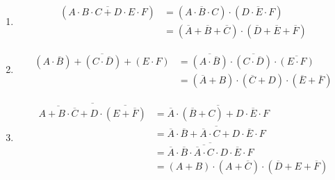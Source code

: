 \documentclass[a4paper]{article}
\begin{document}
{\begin{enumerate}[label=(\alph*)]
        \item
        \begin{align*}
            (\overline{A\cdot B\cdot C+D\cdot E\cdot F})&=(\overline{A\cdot B\cdot C})\cdot (\overline{D\cdot E\cdot F})\\
            &=(\overline{A}+\overline{B}+\overline{C})\cdot (\overline{D}+\overline{E}+\overline{F})
        \end{align*}
        \item
        \begin{align*}
            \overline{(A\cdot\overline{B})+(C\cdot\overline{D})+(E\cdot F)}&=\overline{(A\cdot\overline{B})}\cdot \overline{(C\cdot\overline{D})}\cdot \overline{(E\cdot F)}\\
            &=(\overline{A}+ B)\cdot (\overline{C}+ D)\cdot (\overline{E}+ \overline{F})
        \end{align*}
        \item
        \begin{align*}
             \overline{ \overline{ A + B \cdot \overline{ C}} + D \cdot \overline{ (E + \overline{ F})}} &=
 \overline{ \overline{ A} \cdot (\overline{ B} + C) + D \cdot \overline{ E} \cdot F} \\&=
     \overline{ \overline{ A} \cdot \overline{ B} + \overline{ A} \cdot C + D \cdot \overline{ E} \cdot F} \\&=
     \overline{ \overline{ A} \cdot \overline{ B} \cdot \overline{ \overline{ A} \cdot C} \cdot D \cdot \overline{ E} \cdot F} \\&=
     (A + B) \cdot (A + \overline{ C}) \cdot (\overline{ D} + E + \overline{ F}) 
        \end{align*}
    \end{enumerate}
}
\end{document}
